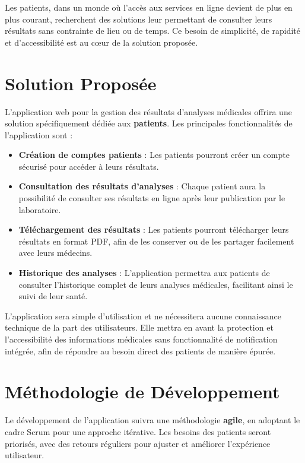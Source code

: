 \documentclass[12pt,a4paper]{report}
\begin{document}
Les patients, dans un monde où l'accès aux services en ligne devient de plus en plus courant, recherchent des solutions leur permettant de consulter leurs résultats sans contrainte de lieu ou de temps. Ce besoin de simplicité, de rapidité et d'accessibilité est au cœur de la solution proposée.

\section{Solution Proposée}
L'application web pour la gestion des résultats d'analyses médicales offrira une solution spécifiquement dédiée aux \textbf{patients}. Les principales fonctionnalités de l'application sont :

\begin{itemize}
    \item \textbf{Création de comptes patients} : Les patients pourront créer un compte sécurisé pour accéder à leurs résultats.
    \item \textbf{Consultation des résultats d'analyses} : Chaque patient aura la possibilité de consulter ses résultats en ligne après leur publication par le laboratoire.
    \item \textbf{Téléchargement des résultats} : Les patients pourront télécharger leurs résultats en format PDF, afin de les conserver ou de les partager facilement avec leurs médecins.
    \item \textbf{Historique des analyses} : L'application permettra aux patients de consulter l'historique complet de leurs analyses médicales, facilitant ainsi le suivi de leur santé.
\end{itemize}

L'application sera simple d'utilisation et ne nécessitera aucune connaissance technique de la part des utilisateurs. Elle mettra en avant la protection et l'accessibilité des informations médicales sans fonctionnalité de notification intégrée, afin de répondre au besoin direct des patients de manière épurée.

\section{Méthodologie de Développement}
Le développement de l'application suivra une méthodologie \textbf{agile}, en adoptant le cadre Scrum pour une approche itérative. Les besoins des patients seront priorisés, avec des retours réguliers pour ajuster et améliorer l'expérience utilisateur.
\end{document}
